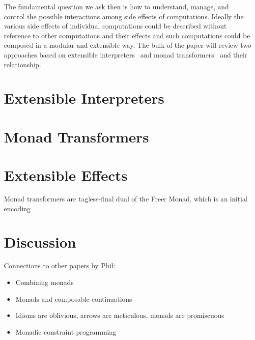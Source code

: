 \documentclass{llncs}
\begin{document}
The fundamental question we ask then is how to understand, manage, and
control the possible interactions among side effects of computations.
Ideally the various side effects of individual computations could be
described without reference to other computations and their effects
and such computations could be composed in a modular and extensible
way. The bulk of the paper will review two approaches based on
extensible interpreters~\cite{cartwright-extensible} and monad
transformers~\cite{liang-interpreter} and their relationship.

\section{Extensible Interpreters}

\section{Monad Transformers}

\section{Extensible Effects}

Monad transformers are tagless-final dual of the Freer Monad, which is
an initial encoding

\section{Discussion}

Connections to other papers by Phil:  
\begin{itemize}
  \item Combining monads
  \item Monads and composable continuations
  \item Idioms are oblivious, arrows are meticulous, monads are promiscuous
  \item Monadic constraint programming
\end{itemize}




\end{document}

